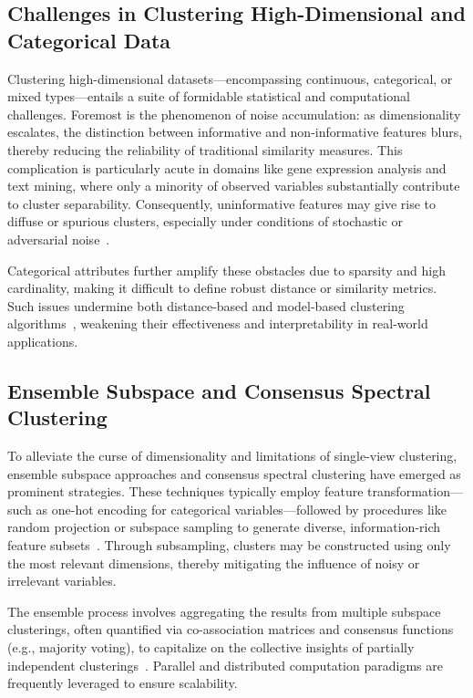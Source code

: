 \documentclass[sigconf]{acmart}
\begin{document}
\subsection{Challenges in Clustering High-Dimensional and Categorical Data}

Clustering high-dimensional datasets—encompassing continuous, categorical, or mixed types—entails a suite of formidable statistical and computational challenges. Foremost is the phenomenon of noise accumulation: as dimensionality escalates, the distinction between informative and non-informative features blurs, thereby reducing the reliability of traditional similarity measures. This complication is particularly acute in domains like gene expression analysis and text mining, where only a minority of observed variables substantially contribute to cluster separability. Consequently, uninformative features may give rise to diffuse or spurious clusters, especially under conditions of stochastic or adversarial noise~\cite{ref116}. 

Categorical attributes further amplify these obstacles due to sparsity and high cardinality, making it difficult to define robust distance or similarity metrics. Such issues undermine both distance-based and model-based clustering algorithms~\cite{ref116}, weakening their effectiveness and interpretability in real-world applications.

\subsection{Ensemble Subspace and Consensus Spectral Clustering}

To alleviate the curse of dimensionality and limitations of single-view clustering, ensemble subspace approaches and consensus spectral clustering have emerged as prominent strategies. These techniques typically employ feature transformation—such as one-hot encoding for categorical variables—followed by procedures like random projection or subspace sampling to generate diverse, information-rich feature subsets~\cite{ref96,ref116}. Through subsampling, clusters may be constructed using only the most relevant dimensions, thereby mitigating the influence of noisy or irrelevant variables.

The ensemble process involves aggregating the results from multiple subspace clusterings, often quantified via co-association matrices and consensus functions (e.g., majority voting), to capitalize on the collective insights of partially independent clusterings~\cite{ref97,ref101}. Parallel and distributed computation paradigms are frequently leveraged to ensure scalability.
\end{document}
